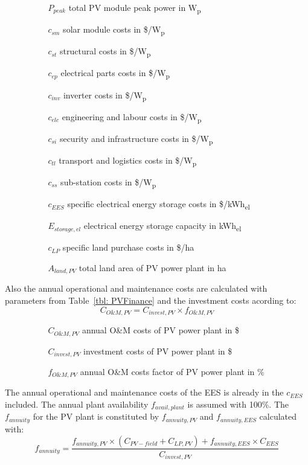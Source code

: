 \documentclass[Master,MEE,english]{twbook}%
\begin{document}
\begin{itemize}
\item[ ] 
\begin{itemize}
\item[ ] 
\begin{itemize}
\item[$P_{peak}$]total PV module peak power in W\textsubscript{p}
\item[$c_{sm}$]solar module costs in \$/W\textsubscript{p}
\item[$c_{st}$]structural costs in \$/W\textsubscript{p}
\item[$c_{ep}$]electrical parts costs in \$/W\textsubscript{p}
\item[$c_{inv}$]inverter costs in \$/W\textsubscript{p}
\item[$c_{elc}$]engineering and labour costs in \$/W\textsubscript{p}
\item[$c_{si}$]security and infrastructure costs in \$/W\textsubscript{p}
\item[$c_{tl}$]transport and logistics costs in \$/W\textsubscript{p}
\item[$c_{ss}$]sub-station costs in \$/W\textsubscript{p}
\item[$c_{EES}$]specific electrical energy storage costs in \$/kWh\textsubscript{el}
\item[$E_{storage,el}$]electrical energy storage capacity in kWh\textsubscript{el}
\item[$c_{LP}$]specific land purchase costs in \$/ha
\item[$A_{land,PV}$]total land area of PV power plant in ha
\end{itemize}
\end{itemize}
\end{itemize}
Also the annual operational and maintenance costs are calculated with parameters from Table~\ref{tbl: PVFinance} and the investment costs acording to:
\begin{equation}
C_{O\&M,PV} = C_{invest,PV} \times f_{O\&M,PV}
\end{equation} 
\begin{itemize}
\item[ ] 
\begin{itemize}
\item[ ] 
\begin{itemize}
\item[$C_{O\&M,PV}$]annual O\&M costs of PV power plant in \$
\item[$C_{invest,PV}$]investment costs of PV power plant in \$
\item[$f_{O\&M,PV}$]annual O\&M costs factor of PV power plant in \%
\end{itemize}
\end{itemize}
\end{itemize}
The annual operational and maintenance costs of the EES is already in the $c_{EES}$ included. The annual plant availability $f_{avail,plant}$ is assumed with 100\%. The $f_{annuity}$ for the PV plant is constituted by $f_{annuity,PV}$ and $f_{annuity,EES}$  calculated with:
\begin{equation}
f_{annuity}=\frac{f_{annuity,PV}\times(C_{PV-field}+C_{LP,PV})+ f_{annuity,EES}\times C_{EES}}{C_{invest,PV}}
\end{equation}

\pagebreak
\end{document}
